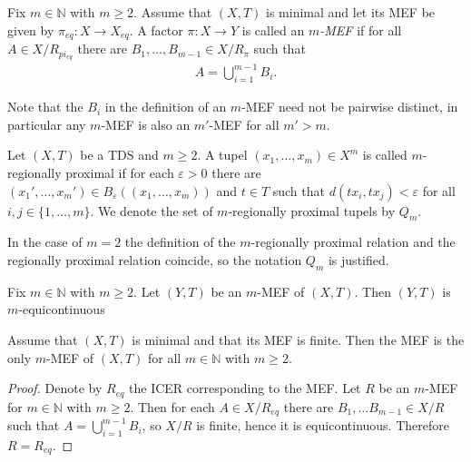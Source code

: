 \begin{definition}[$m$-MEF]
	Fix $m \in \mathbb{N}$ with $m \geq 2$. Assume that $(X, T)$ is minimal and let its MEF be given by $\pi_{eq}: X \to X_{eq}$. A factor $\pi: X \to Y$ is called an \emph{$m$-MEF} if for all $A \in X/R_{pi_{eq}}$ there are $B_1, \dots, B_{m-1} \in X/R_\pi$ such that
	\begin{align*}
		A = \bigcup_{i=1}^{m-1} B_i.
	\end{align*}
\end{definition}

\begin{remark}
	Note that the $B_i$ in the definition of an $m$-MEF need not be pairwise distinct, in particular any $m$-MEF is also an $m'$-MEF for all $m' > m$.
\end{remark}

\begin{definition}
	Let $(X, T)$ be a TDS and $m \geq 2$.
	A tupel $(x_1, \dots, x_m) \in X^m$ is called $m$-regionally proximal if for each $\varepsilon > 0$
	there are $(x_1', \dots, x_m') \in B_\varepsilon((x_1, \dots, x_m))$ and $t \in T$ such that $d(tx_i, tx_j) < \varepsilon$ for all $i, j \in \{1, \dots, m\}$.
	We denote the set of $m$-regionally proximal tupels by $Q_m$.
\end{definition}

\begin{remark}
	In the case of $m = 2$ the definition of the $m$-regionally proximal relation and the regionally proximal relation coincide,
	so the notation $Q_m$ is justified.
\end{remark}

\begin{proposition}
	Fix $m \in \mathbb{N}$ with $m \geq 2$. Let $(Y, T)$ be an $m$-MEF of $(X, T)$. Then $(Y, T)$ is $m$-equicontinuous
\end{proposition}

\begin{proposition}
	Assume that $(X, T)$ is minimal and that its MEF is finite. Then the MEF is the only $m$-MEF of $(X, T)$ for all $m \in \mathbb{N}$ with $m \geq 2$.
\end{proposition}
\begin{proof}
	Denote by $R_{eq}$ the ICER corresponding to the MEF. Let $R$ be an $m$-MEF for $m \in \mathbb{N}$ with $m \geq 2$. Then for each $A \in X/R_{eq}$ there are $B_1, \dots B_{m-1} \in X/R$ such that $A = \bigcup_{i=1}^{m-1} B_i$, so $X/R$ is finite, hence it is equicontinuous. Therefore $R = R_{eq}$.
\end{proof}

